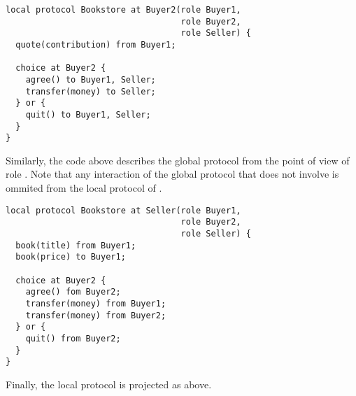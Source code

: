 \begin{lstlisting}[caption={Local Protocol for Role \BuyerTwo}]
local protocol Bookstore at Buyer2(role Buyer1,
                                   role Buyer2,
                                   role Seller) {
  quote(contribution) from Buyer1;

  choice at Buyer2 {
    agree() to Buyer1, Seller;
    transfer(money) to Seller;
  } or {
    quit() to Buyer1, Seller;
  }
}
\end{lstlisting}

Similarly, the code above describes the global protocol
from the point of view of role \BuyerTwo. Note that any
interaction of the global protocol that does not involve
\BuyerTwo is ommited from the local protocol of \BuyerTwo.

\begin{lstlisting}[caption={Local Protocol for Role \Seller}]
local protocol Bookstore at Seller(role Buyer1,
                                   role Buyer2,
                                   role Seller) {
  book(title) from Buyer1;
  book(price) to Buyer1;

  choice at Buyer2 {
    agree() fom Buyer2;
    transfer(money) from Buyer1;
    transfer(money) from Buyer2;
  } or {
    quit() from Buyer2;
  }
}
\end{lstlisting}

Finally, the \Seller local protocol is projected as above.
